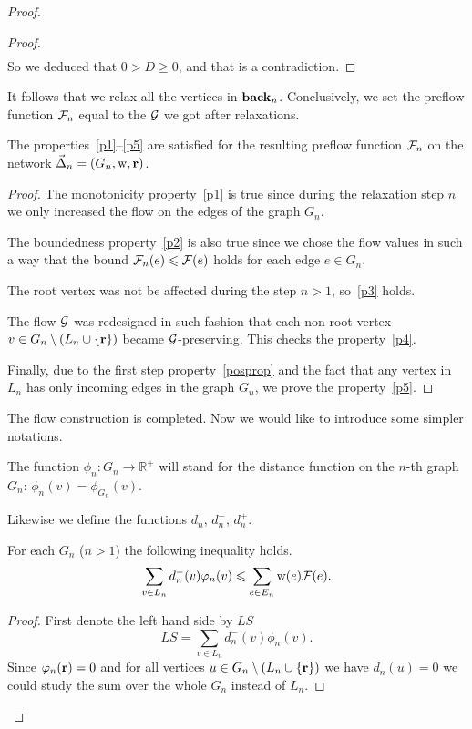 \documentclass[12pt]{amsart}
\begin{document}
\begin{proof}
\begin{proof}
\[\begin{split}
        \end{split}
      \]
        So we deduced that $0 > D \geq 0$, and that is a contradiction.
      \end{proof}
      It follows that we relax all the vertices in $\eback_n$.
      Conclusively, we set the preflow function $\flowposn{n}$ equal to the $\cal{G}$ we got after relaxations.
      \begin{prop}
        The properties~\ref{p1}--\ref{p5} are satisfied for the resulting preflow function $\flowposn{n}$ on the network $\onet_n = (G_n, \wtp, \root)$.
      \end{prop}
      \begin{proof}
        The monotonicity property~\ref{p1} is true since during the relaxation step $n$ we
          only increased the flow on the edges of the graph $G_n$.

        The boundedness property~\ref{p2} is also true since we chose the flow values in such a way
          that the bound $\flowposn{n}(e) \leq \flowpos(e)$ holds for each edge $e\in G_n$.

        The root vertex was not be affected during the step $n > 1$, so~\ref{p3} holds.

        The flow $\cal{G}$ was redesigned in such fashion that each non-root vertex $v \in G_{n} \setminus 
          \left(L_n \cup \{\root\}\right)$ became $\cal{G}$-preserving.
        This checks the property~\ref{p4}.

        Finally, due to the first step property~\ref{posprop} and the fact that
        any vertex in $L_n$ has only incoming edges in the graph $G_n$, we prove the property~\ref{p5}.
      \end{proof}
      The flow construction is completed.
      Now we would like to introduce some simpler notations.
      \begin{definition}
        The function $\phi_n: G_n \to \mathbb{R}^{+}$ will stand for the distance function on the $n$-th graph $G_n$:
          $\phi_n(v) = \phi_{G_n}(v)$.
      \end{definition}
      Likewise we define the functions $d_n$, $d^{-}_n$, $d^{+}_n$.
      \begin{lemma}
        For each $G_n$ ($n > 1$) the following inequality holds.
        \begin{equation}
          \label{main-ineq}
          \sum_{v\in L_n}d_{n}^{-}(v) \phi_n(v) \leq \sum_{e \in E_n} \wtp(e) \flowpos(e).
        \end{equation}
      \end{lemma}
      \begin{proof}
        First denote the left hand side by $LS$
        \[
          LS = \sum\limits_{v \in L_n} d_n^{-}(v) \phi_n(v).
        \]
        Since $\phi_n(\root) = 0$ and for all vertices $u \in G_{n} \setminus \left(L_n \cup \{\root\}\right)$
          we have $d_n(u) = 0$ we could study the sum over the whole $G_n$ instead of $L_n$.


\end{proof}
\end{proof}
\end{document}
